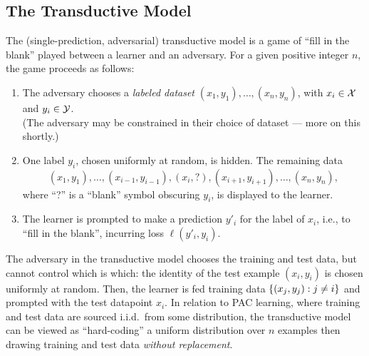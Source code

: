 \subsection{The Transductive Model}
The (single-prediction, adversarial) transductive model is  a game of ``fill in the blank'' played between a learner and an adversary. For a given positive integer $n$, the game proceeds as follows:
\begin{enumerate}
\item The adversary chooses a \emph{labeled dataset} $(x_1,y_1), \ldots,(x_n,y_n)$, with $x_i \in \mathcal{X}$ and $y_i \in \mathcal{Y}$. \\(The adversary may  be constrained in their choice of dataset --- more on this shortly.)
\item One label $y_i$, chosen uniformly at random, is hidden. The remaining data \[(x_1,y_1),\ldots,(x_{i-1},y_{i-1}),(x_i,?),(x_{i+1},y_{i+1}),\ldots,(x_n,y_n),\] where ``?'' is a ``blank'' symbol obscuring $y_i$, is displayed to the learner. 
\item The learner is prompted to make a prediction $y'_i$ for the label of $x_i$, i.e., to ``fill in the blank'', incurring loss $\ell(y'_i,y_i)$.
\end{enumerate}

The adversary in the transductive model chooses the training and test data, but cannot control which is which: the identity of the test example $(x_i,y_i)$ is chosen uniformly at random. Then, the learner is fed training data   $\left\{ (x_j,y_j) : j \neq i \right\}$ and prompted with the test datapoint $x_i$. In relation to  PAC learning, where training and test data are sourced i.i.d.~from some distribution, the transductive model can be viewed as ``hard-coding'' a uniform distribution over $n$ examples then drawing training and test data \emph{without replacement}.






